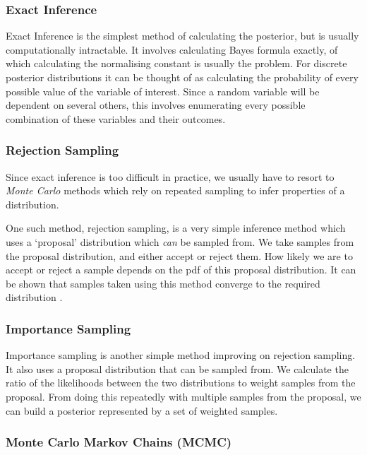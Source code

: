 \subsubsection{Exact Inference}
	
Exact Inference is the simplest method of calculating the posterior, but is usually computationally intractable. It involves calculating Bayes formula exactly, of which calculating the normalising constant is usually the problem. For discrete posterior distributions it can be thought of as calculating the probability of every possible value of the variable of interest. Since a random variable will be dependent on several others, this involves enumerating every possible combination of these variables and their outcomes.
	
\subsubsection{Rejection Sampling}
				
Since exact inference is too difficult in practice, we usually have to resort to \textit{Monte Carlo} \cite{monte-carlo} methods which rely on repeated sampling to infer properties of a distribution.
			
One such method, rejection sampling, is a very simple inference method which uses a `proposal' distribution which \textit{can} be sampled from. We take samples from the proposal distribution, and either accept or reject them. How likely we are to accept or reject a sample depends on the pdf of this proposal distribution. It can be shown that samples taken using this method converge to the required distribution \cite{flury1990acceptance}. 
			
\subsubsection{Importance Sampling}
			
Importance sampling is another simple method improving on rejection sampling. It also uses a proposal distribution that can be sampled from. We calculate the ratio of the likelihoods between the two distributions to weight samples from the proposal. From doing this repeatedly with multiple samples from the proposal, we can build a posterior represented by a set of weighted samples.
				
\subsubsection{Monte Carlo Markov Chains (MCMC)}
		
